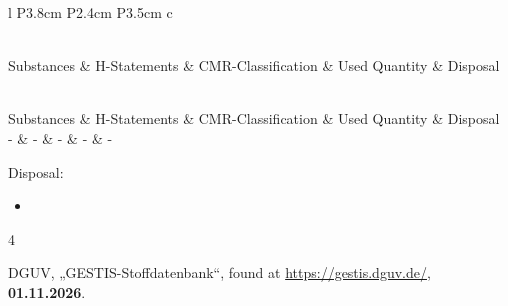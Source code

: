 \documentclass[
	a4paper,										%
	12pt,											%
	twoside,										%
	headsepline,								%
	footsepline,									%
	captions=tableheading,					%
]{scrartcl}
\newcommand{\langetabelle}[6]{  %
	\begin{centering}           %
		{\begin{longtable}[#3]{#4}
				\caption{#2\label{tab: #1}}\\				
				\hline
				#5
				\hline
				\endfirsthead
                \caption{#2\label{tab: #1}}\\
				\hline
				#5
				\hline
				\endhead
				#6												
				\hline 
		\end{longtable}}
\end{centering}}
\begin{document}
\langetabelle
	{KMR_leer3}
	{Carcinogenic, mutagenic or reprotoxic hazardous substances used (CMR).}
	{H}
	{l P{3.8cm} P{2.4cm} P{3.5cm} c}
	{Substances & H-Statements & CMR-Classification & Used Quantity & Disposal \\}
	{ - & - & - & - & - \\}
	
Disposal: \\
\begin{itemize}
    \item[(1)] 
\end{itemize}	


\begin{thebibliography}{4}		%


						{DGUV}, 
						„{GESTIS-Stoffdatenbank}“, found at 
			\url		{https://gestis.dguv.de/}, 
			\textbf	{01.11.2026}.
	

\end{thebibliography}
\end{document}
